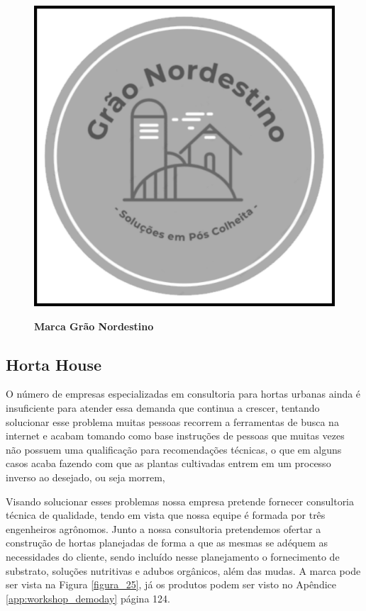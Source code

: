 \begin{figure}[H]
\centering
\caption{\textbf{Marca Grão Nordestino}}
\includegraphics[scale=0.07]{Imagens/graonordestino.png}
\label{figura_21}
\end{figure}



\subsection{Horta House}


O número de empresas especializadas em consultoria para hortas urbanas ainda é insuficiente para atender essa demanda que continua a crescer, tentando solucionar esse problema muitas pessoas recorrem a ferramentas de busca na internet e acabam tomando como base instruções de pessoas que muitas vezes não possuem uma qualificação para recomendações técnicas, o que em alguns casos acaba fazendo com que as plantas cultivadas entrem em um processo inverso ao desejado, ou seja morrem,

Visando solucionar esses problemas nossa empresa pretende fornecer consultoria técnica de qualidade, tendo em vista que nossa equipe é formada por três engenheiros agrônomos. Junto a nossa
consultoria pretendemos ofertar a construção de hortas planejadas de forma a que as mesmas se adéquem as necessidades do cliente, sendo incluído nesse planejamento o fornecimento de substrato, soluções nutritivas e adubos orgânicos, além das mudas. A marca pode ser vista na Figura \ref{figura_25}, já os produtos podem ser visto no Apêndice \ref{app:workshop_demoday} página 124.


